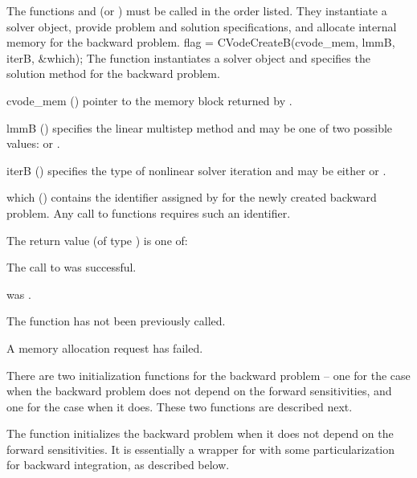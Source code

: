 The functions  and  (or ) must be 
called in the order listed. They instantiate a {\cvodes} solver object, provide problem 
and solution specifications, and allocate internal memory for the backward problem.
{
  flag = CVodeCreateB(cvode\_mem, lmmB, iterB, \&which);
}
{
  The function  instantiates a {\cvodes} solver object and specifies 
  the solution method for the backward problem.
}
{
  \begin{args}
  \item[cvode\_mem] ()
    pointer to the {\cvodes} memory block returned by .
  \item[lmmB] ()
    specifies the linear multistep method and may be one of two
    possible values:  or .     
  \item[iterB] ()
    specifies the type of nonlinear solver iteration and may be
    either  or . 
  \item[which] ()
    contains the identifier assigned by {\cvodes} for the newly created backward 
    problem. Any call to  functions requires such an identifier.
  \end{args}
}
{
   The return value  (of type ) is one of:
   \begin{args}
   \item[\Id{CV\_SUCCESS}]
     The call to  was successful.
   \item[\Id{CV\_MEM\_NULL}]
      was .
   \item[\Id{CV\_NO\_ADJ}]
     The function  has not been previously called.
   \item[\Id{CV\_MEM\_FAIL}]
     A memory allocation request has failed.
   \end{args}
}
{}

There are two initialization functions for the backward problem -- one for
the case when the backward problem does not depend on the forward
sensitivities, and one for the case when it does.  These two functions
are described next.

The function  initializes the backward problem when it does
not depend on the forward sensitivities.  It is essentially a wrapper for 
 with some particularization for backward integration, as described below.

